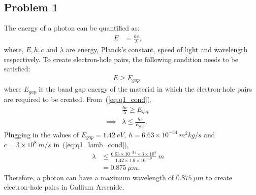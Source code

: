 \subsection*{Problem 1}
The energy of a photon can be quantified as:
\begin{align*}
	E &= \frac{hc}{\lambda},
\end{align*}
where, $E, h, c$ and $\lambda$ are energy, Planck's constant, speed of light and wavelength respectively. To create electron-hole pairs, the following condition needs to be satisfied:
\begin{align}\label{eq:q1_cond}
	E \geq E_{gap},
\end{align} 
where $E_{gap}$ is the band gap energy of the material in which the electron-hole pairs are required to be created. From~(\ref{eq:q1_cond}),
\begin{align}\label{eq:q1_lamb_cond}
	&\frac{hc}{\lambda} \geq E_{gap} \nonumber\\
	\implies & \lambda \leq \frac{hc}{E_{gap}}.
\end{align}
Plugging in the values of $E_{gap} = 1.42\ eV,\ h=6.63\times10^{-34}\ m^2kg/s$ and $c=3\times10^8\ m/s$ in~(\ref{eq:q1_lamb_cond}),
\begin{align*}
	\lambda &\leq \frac{6.63\times 10^{-34}\times 3\times 10^8}{1.42\times 1.6\times 10^{-19}}\ m\\
	&= 0.875\ \mu m.
\end{align*}
Therefore, a photon can have a maximum wavelength of $0.875\ \mu m$ to create electron-hole pairs in Gallium Arsenide.